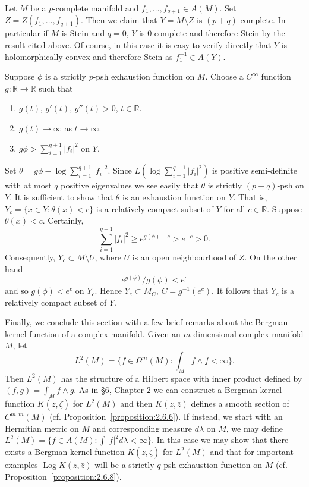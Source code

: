 Let $M$ be a $p$-complete manifold and $f_1,\ldots,f_{q+1}\in A(M)$. Set $Z=Z(f_1,\ldots,f_{q+1})$. Then we claim that $Y=M\setminus Z$ is $(p+q)$-complete. In particular if $M$ is Stein and $q=0$, $Y$ is 0-complete and therefore Stein by the result cited above. Of course, in this case it is easy to verify directly that $Y$ is holomorphically convex and therefore Stein as $f_1^{-1}\in A(Y)$.

Suppose $\phi$ is a strictly $p$-psh exhaustion function on $M$. Choose a $C^\infty$ function $g:\mathbb R\to\mathbb R$ such that
\begin{enumerate}
\item $g(t)$, $g'(t)$, $g''(t)>0$, $t\in\mathbb R$.
\item $g(t)\to\infty$ as $t\to\infty$.
\item $g\phi>\sum_{i=1}^{q+1}|f_i|^2$ on $Y$.
\end{enumerate}
Set $\theta=g\phi-\log\sum_{i=1}^{q+1}|f_i|^2$. Since $L(\log\sum_{i=1}^{q+1}|f_i|^2)$ is positive semi-definite with at most $q$ positive eigenvalues we see easily that $\theta$ is strictly $(p+q)$-psh on $Y$. It is sufficient to show that $\theta$ is an exhaustion function on $Y$. That is, $Y_c=\{x\in Y:\theta(x)<c\}$ is a relatively compact subset of $Y$ for all $c\in\mathbb R$. Suppose $\theta(x)<c$. Certainly,
\[\sum_{i=1}^{q+1}|f_i|^2\geq e^{g(\phi)-c}>e^{-c}>0.\]
Consequently, $Y_c\subset M\setminus U$, where $U$ is an open neighbourhood of $Z$. On the other hand
\[e^{g(\phi)}/g(\phi)<e^c\]
and so $g(\phi)<e^c$ on $Y_c$. Hence $Y_c\subset M_C$, $C=g^{-1}(e^c)$. It follows that $Y_c$ is a relatively compact subset of $Y$.

Finally, we conclude this section with a few brief remarks about the Bergman kernel function of a complex manifold. Given an $m$-dimensional complex manifold $M$, let
\[L^2(M)=\{f\in\Omega^m(M):\int_M f\wedge\bar f<\infty\}.\]
Then $L^2(M)$ has the structure of a Hilbert space with inner product defined by $(f,g)=\int_M f\wedge\bar g$. As in \hyperref[sec:2:6]{\S6, Chapter 2} we can construct a Bergman kernel function $K(z,\bar\zeta)$ for $L^2(M)$ and then $K(z,\bar z)$ defines a smooth section of $C^{m,m}(M)$ (cf. Proposition~\ref{proposition:2.6.6}). If instead, we start with an Hermitian metric on $M$ and corresponding measure $d\lambda$ on $M$, we may define $L^2(M)=\{f\in A(M):\int|f|^2d\lambda<\infty\}$. In this case we may show that there exists a Bergman kernel function $K(z,\bar\zeta)$ for $L^2(M)$ and that for important examples $\operatorname{Log}K(z,\bar z)$ will be a strictly $q$-psh exhaustion function on $M$ (cf. Proposition~\ref{proposition:2.6.8}).

